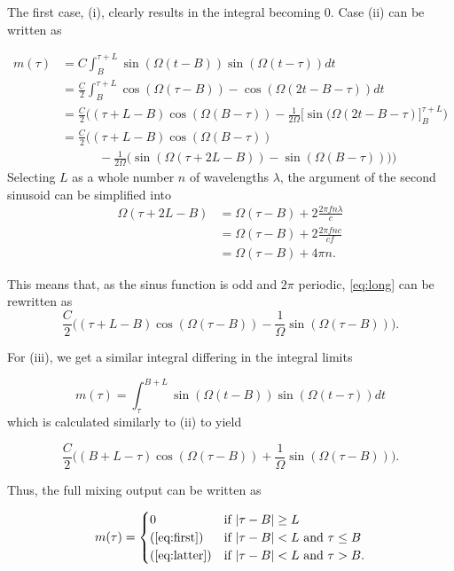 \begin{appendices}
The first case, (i), clearly results in the integral becoming 0. Case (ii) can be written as

\begin{align}
	m(\tau)
	&= C\int_{B}^{\tau+L}\sin(\Omega(t-B))\sin(\Omega(t-\tau))dt \\
	&= \frac{C}{2}\int_B^{\tau+L} \cos(\Omega(\tau-B)) - \cos(\Omega(2t - B - \tau))dt \\
	&= \frac{C}{2}\Big( (\tau+L-B)\cos(\Omega(B-\tau))
	- \frac{1}{2\Omega}\Big[ \sin(\Omega(2t-B-\tau) \Big]_{B}^{\tau+L} \Big) \\
	&= \frac{C}{2}\Big((\tau + L - B)\cos(\Omega(B-\tau)) \\ 
	&\quad\quad\quad - \frac{1}{2\Omega}\big(
	\sin(\Omega(\tau + 2L - B))
	- \sin(\Omega(B-\tau))
	\big)\Big)
\end{align}
Selecting $L$ as a whole number $n$ of wavelengths $\lambda$, the argument of the second sinusoid can be simplified into
\begin{align}
	\Omega(\tau + 2L - B) 
	&= \Omega(\tau - B) + 2\frac{2\pi f n\lambda}{c} \\
	&= \Omega(\tau - B) + 2\frac{2\pi f n c}{c f} \\
	&= \Omega(\tau - B) + 4\pi n.
\end{align}

This means that, as the sinus function is odd and $2\pi$ periodic, \eqref{eq:long} can be rewritten as 
\begin{equation}\label{eq:first}
	 \frac{C}{2}\Big( (\tau+L-B)\cos(\Omega(\tau - B)) 
	- \frac{1}{\Omega}\sin(\Omega(\tau - B))\Big).
\end{equation}

For (iii), we get a similar integral differing in the integral limits

\begin{equation}
	m(\tau) 
	= \int_\tau^{B+L}\sin(\Omega(t-B))\sin(\Omega(t-\tau))dt
\end{equation}
which is calculated similarly to (ii) to yield

\begin{equation}\label{eq:latter}
	\frac{C}{2}\Big( (B + L - \tau)\cos(\Omega(\tau - B))
	+ \frac{1}{\Omega}\sin(\Omega(\tau - B))\Big).
\end{equation}

Thus, the full mixing output can be written as

\begin{equation}
	m(\tau) = \begin{cases}
		0 & \text{if $|\tau-B|\geq L$} \\
		\text{(\ref{eq:first})} & \text{if $|\tau-B| < L$ and $\tau \leq B$} \\
		\text{(\ref{eq:latter})} & \text{if $|\tau-B| < L$ and $\tau>B$}.
	\end{cases}
\end{equation}

\end{appendices}


